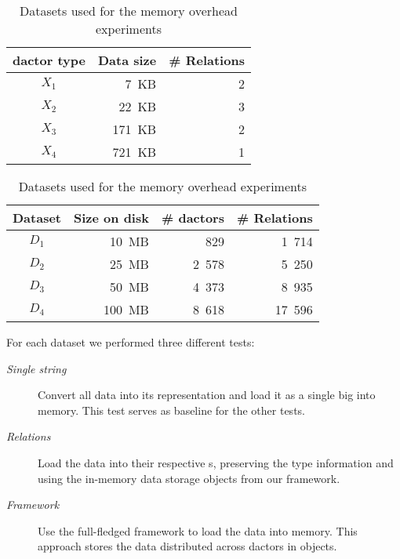   \begin{table}
    \centering
    \begin{subtable}[t]{0.445\textwidth}
      \centering
      \begin{tabular}{@{}crr@{}}
        \toprule
        \textbf{\Gls{dactor} type} & \textbf{Data size} & \textbf{\# Relations}\\
        \midrule
        $X_1$ &   7~KB & 2 \\ %
        $X_2$ &  22~KB & 3 \\ %
        $X_3$ & 171~KB & 2 \\ %
        $X_4$ & 721~KB & 1 \\ %
        \bottomrule
      \end{tabular}
      \label{tab:datasets:size_distribution}
    \end{subtable}
    \begin{subtable}[t]{0.545\textwidth}
      \centering
      \begin{tabular}{@{}crrr@{}}
        \toprule
        \textbf{Dataset} & \textbf{Size on disk} & \textbf{\# \Glspl{dactor}} & \textbf{\# Relations}\\
        \midrule
        $D_1$ & 10~MB & 829 & 1~714 \\
        $D_2$ & 25~MB & 2~578 & 5~250 \\
        $D_3$ & 50~MB & 4~373 & 8~935 \\
        $D_4$ & 100~MB & 8~618 & 17~596 \\
        \bottomrule
      \end{tabular}
      \label{tab:datasets:keyfigures}
    \end{subtable}
    \caption{Datasets used for the memory overhead experiments}
    \label{tab:datasets}
  \end{table}

  For each dataset we performed three different tests:
  \begin{description}
    \item[\textit{Single string}] Convert all data into its  representation and load it as a single big  into memory.
      This test serves as baseline for the other tests.
    \item[\textit{Relations}] Load the data into their respective s, preserving the type information and using the in-memory data storage objects from our framework.
    \item[\textit{Framework}] Use the full-fledged framework to load the data into memory.
      This approach stores the data distributed across \glspl{dactor} in  objects.
  \end{description}

